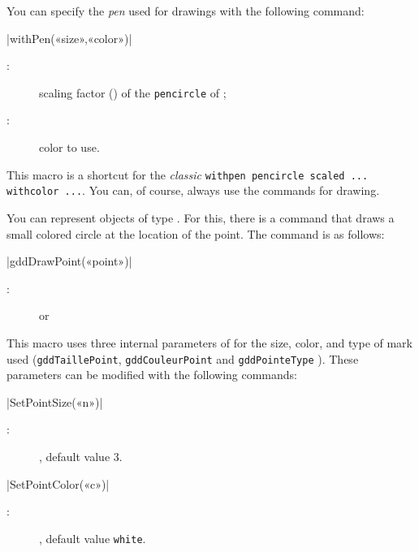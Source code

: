 \documentclass[a4paper,english]{article}
\begin{document}
You can specify the \emph{pen} used for drawings with the following command:

\begin{colourband}
  \macro|withPen(«size»,«color»)|
  \begin{description}
    \item[:] scaling factor () of the 
    \lstinline+pencircle+ of \MP{};
    \item[:] color  to use.
  \end{description}
\end{colourband}
  
This macro is a shortcut for the \emph{classic} \texttt{withpen
pencircle scaled ... withcolor ...}. You can, of course, always use the \MP{} commands for drawing.



You can represent objects of type . For this, there is a command that draws a small colored circle at the location of the point. The command is as follows:

\begin{colourband}
\macro|gddDrawPoint(«point»)|
\begin{description}
  \item[:]  or 
\end{description}
\end{colourband}

This macro uses three internal parameters of \mpgeomdd for the size, color, and type of mark used
(\lstinline+gddTaillePoint+, \lstinline+gddCouleurPoint+
and \lstinline+gddPointeType+  
). These parameters can be modified with the following commands:
\begin{colourband}
\macro|SetPointSize(«n»)|
\begin{description}
  \item[:] , default value 3.
\end{description}
\end{colourband}

\begin{colourband}
\macro|SetPointColor(«c»)| 
\begin{description}
  \item[:] , default value \lstinline+white+.
\end{description}
\end{colourband}
\end{document}
